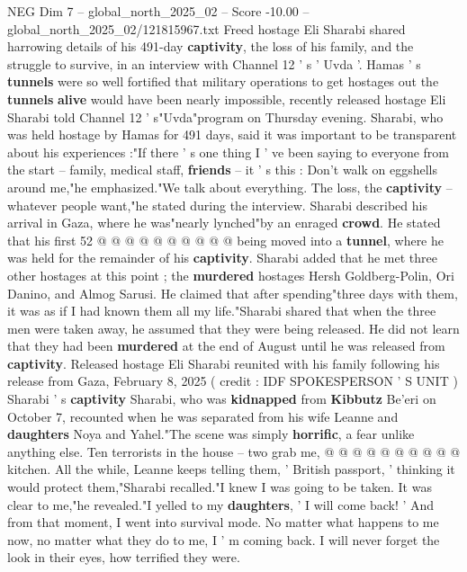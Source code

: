\begin{textsample}{NEG Dim 7 – global\_north\_2025\_02 – Score -10.00 – global\_north\_2025\_02/121815967.txt}  \label{ex:f7_neg_063}
Freed hostage Eli Sharabi shared harrowing details of his 491-day \textbf{captivity}, the loss of his family, and the struggle to survive, in an interview with Channel 12 ' s ' Uvda '.
Hamas ' s \textbf{tunnels} were so well fortified that military operations to get hostages out the \textbf{tunnels} \textbf{alive} would have been nearly impossible, recently released hostage Eli Sharabi told Channel 12 ' s"Uvda"program on Thursday evening.
Sharabi, who was held hostage by Hamas for 491 days, said it was important to be transparent about his experiences :"If there ' s one thing I ' ve been saying to everyone from the start -- family, medical staff, \textbf{friends} -- it ' s this : Don't walk on eggshells around me,"he emphasized."We talk about everything.
The loss, the \textbf{captivity} -- whatever people want,"he stated during the interview.
Sharabi described his arrival in Gaza, where he was"nearly lynched"by an enraged \textbf{crowd}.
He stated that his first 52 @ @ @ @ @ @ @ @ @ @ being moved into a \textbf{tunnel}, where he was held for the remainder of his \textbf{captivity}.
Sharabi added that he met three other hostages at this point ; the \textbf{murdered} hostages Hersh Goldberg-Polin, Ori Danino, and Almog Sarusi.
He claimed that after spending"three days with them, it was as if I had known them all my life."Sharabi shared that when the three men were taken away, he assumed that they were being released.
He did not learn that they had been \textbf{murdered} at the end of August until he was released from \textbf{captivity}.
Released hostage Eli Sharabi reunited with his family following his release from Gaza, February 8, 2025 ( credit : IDF SPOKESPERSON ' S UNIT ) Sharabi ' s \textbf{captivity} Sharabi, who was \textbf{kidnapped} from \textbf{Kibbutz} Be'eri on October 7, recounted when he was separated from his wife Leanne and \textbf{daughters} Noya and Yahel."The scene was simply \textbf{horrific}, a fear unlike anything else.
Ten terrorists in the house -- two grab me, @ @ @ @ @ @ @ @ @ @ kitchen.
All the while, Leanne keeps telling them, ' British passport, ' thinking it would protect them,"Sharabi recalled."I knew I was going to be taken.
It was clear to me,"he revealed."I yelled to my \textbf{daughters}, ' I will come back! ' And from that moment, I went into survival mode.
No matter what happens to me now, no matter what they do to me, I ' m coming back.
I will never forget the look in their eyes, how terrified they were.

\end{textsample}
